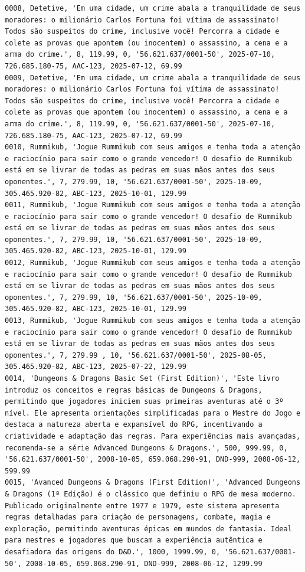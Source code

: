 \documentclass[11pt]{article}
\begin{document}
\begin{Verbatim}[breaklines=true, breakanywhere=true]
0008, Detetive, 'Em uma cidade, um crime abala a tranquilidade de seus moradores: o milionário Carlos Fortuna foi vítima de assassinato! Todos são suspeitos do crime, inclusive você! Percorra a cidade e colete as provas que apontem (ou inocentem) o assassino, a cena e a arma do crime.', 8, 119.99, 0, '56.621.637/0001-50', 2025-07-10, 726.685.180-75, AAC-123, 2025-07-12, 69.99
0009, Detetive, 'Em uma cidade, um crime abala a tranquilidade de seus moradores: o milionário Carlos Fortuna foi vítima de assassinato! Todos são suspeitos do crime, inclusive você! Percorra a cidade e colete as provas que apontem (ou inocentem) o assassino, a cena e a arma do crime.', 8, 119.99, 0, '56.621.637/0001-50', 2025-07-10, 726.685.180-75, AAC-123, 2025-07-12, 69.99
0010, Rummikub, 'Jogue Rummikub com seus amigos e tenha toda a atenção e raciocínio para sair como o grande vencedor! O desafio de Rummikub está em se livrar de todas as pedras em suas mãos antes dos seus oponentes.', 7, 279.99, 10, '56.621.637/0001-50', 2025-10-09, 305.465.920-82, ABC-123, 2025-10-01, 129.99
0011, Rummikub, 'Jogue Rummikub com seus amigos e tenha toda a atenção e raciocínio para sair como o grande vencedor! O desafio de Rummikub está em se livrar de todas as pedras em suas mãos antes dos seus oponentes.', 7, 279.99, 10, '56.621.637/0001-50', 2025-10-09, 305.465.920-82, ABC-123, 2025-10-01, 129.99
0012, Rummikub, 'Jogue Rummikub com seus amigos e tenha toda a atenção e raciocínio para sair como o grande vencedor! O desafio de Rummikub está em se livrar de todas as pedras em suas mãos antes dos seus oponentes.', 7, 279.99, 10, '56.621.637/0001-50', 2025-10-09, 305.465.920-82, ABC-123, 2025-10-01, 129.99
0013, Rummikub, 'Jogue Rummikub com seus amigos e tenha toda a atenção e raciocínio para sair como o grande vencedor! O desafio de Rummikub está em se livrar de todas as pedras em suas mãos antes dos seus oponentes.', 7, 279.99 , 10, '56.621.637/0001-50', 2025-08-05, 305.465.920-82, ABC-123, 2025-07-22, 129.99
0014, 'Dungeons & Dragons Basic Set (First Edition)', 'Este livro introduz os conceitos e regras básicas de Dungeons & Dragons, permitindo que jogadores iniciem suas primeiras aventuras até o 3º nível. Ele apresenta orientações simplificadas para o Mestre do Jogo e destaca a natureza aberta e expansível do RPG, incentivando a criatividade e adaptação das regras. Para experiências mais avançadas, recomenda-se a série Advanced Dungeons & Dragons.', 500, 999.99, 0, '56.621.637/0001-50', 2008-10-05, 659.068.290-91, DND-999, 2008-06-12, 599.99
0015, 'Avanced Dungeons & Dragons (First Edition)', 'Advanced Dungeons & Dragons (1ª Edição) é o clássico que definiu o RPG de mesa moderno. Publicado originalmente entre 1977 e 1979, este sistema apresenta regras detalhadas para criação de personagens, combate, magia e exploração, permitindo aventuras épicas em mundos de fantasia. Ideal para mestres e jogadores que buscam a experiência autêntica e desafiadora das origens do D&D.', 1000, 1999.99, 0, '56.621.637/0001-50', 2008-10-05, 659.068.290-91, DND-999, 2008-06-12, 1299.99


\end{Verbatim}
\end{document}
